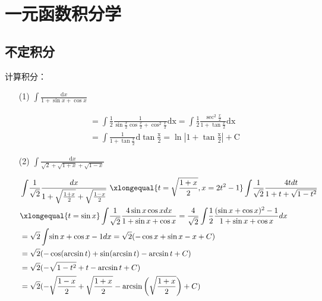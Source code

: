 

\chapter{一元函数积分学}\label{cha:3}
\section{不定积分}
\begin{xiti}
	\item 计算积分：
	\begin{enumerate}
	
		\item[(1)] $\int \frac {\mathrm{d}x } { 1 + \sin x + \cos x }$
		
		\begin{solution}
		\begin{align*}	
		&{}=\int \! \frac{1}{2}  \frac{1}{\sin \frac{x}{2} \cos \frac{x}{2} +\cos^2 \frac{x}{2} } \mathrm{dx}=\int\!\frac{1}{2} \frac{\sec^2 \frac{x}{2}}{1+\tan \frac{x}{2}} \mathrm{dx}\\
		&{}=\int \frac{1}{1+\tan \frac{x}{2}}\mathrm{d\tan \frac{x}{2}
		=\ln|1+\tan \frac{x}{2}| +C}
	\end{align*}
		\end{solution}
		
		\item[(2)]  $\int \frac { \mathrm { d } x } { \sqrt { 2 } + \sqrt { 1 + x } + \sqrt { 1 - x } }$
		
		\begin{solution}
		\begin{align*}
			&{}\int\! \frac{1}{\sqrt{2}}\frac{dx}{1+ {\sqrt{\frac{1+x}{2}}}+\sqrt{\frac{1-x}{2}}}\
			\xlongequal{t=\sqrt{\frac{1+x}{2}},x=2t^2-1 }\int\! \frac{1}{\sqrt{2}} \frac{4t dt } { 1+t+\sqrt{1-t^2} }\\
			&{}\xlongequal{t=\sin x}\int\! \frac{1}{\sqrt{2}}\frac{4\sin x \cos x dx }{1+\sin x +\cos x}= \frac{4}{\sqrt{2}}\int\!\frac{1}{2}\frac{(\sin x+\cos x)^2-1}{1+\sin x+\cos x }dx\\
			&{}=\sqrt{2}\int\!\sin x+\cos x-1dx= \sqrt{2}(-\cos x+\sin x-x +C)\\
			&{}=\sqrt{2}(-\cos (\arcsin t)+\sin (\arcsin t)- \arcsin t+C)\\
			&{}=\sqrt{2}(-\sqrt{1-t^2}+t-\arcsin t+C)\\
			&{}=\sqrt{2}( -\sqrt{\frac{1-x}{2}}+\sqrt{\frac{1+x}{2}}-\arcsin \bigg(\sqrt{\frac{1+x}{2}}\bigg)+C )	
		\end{align*}
		\end{solution}


\end{enumerate}
\end{xiti}

